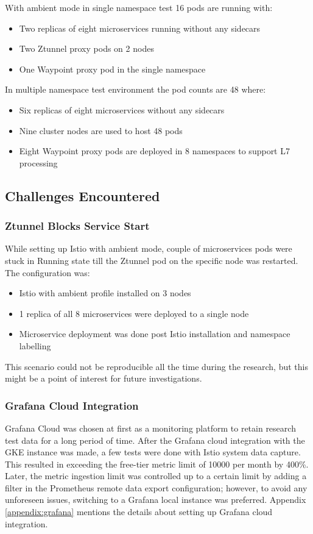 With ambient mode in single namespace test 16 pods are running with:
\begin{itemize}
  \item Two replicas of eight microservices running without any sidecars
  \item Two Ztunnel proxy pods on 2 nodes
  \item One Waypoint proxy pod in the single namespace
\end{itemize}

In multiple namespace test environment the pod counts are 48 where:
\begin{itemize}
  \item Six replicas of eight microservices without any sidecars
  \item Nine cluster nodes are used to host 48 pods
  \item Eight Waypoint proxy pods are deployed in 8 namespaces to support L7 processing
\end{itemize}

\subsection{Challenges Encountered}
\subsubsection{Ztunnel Blocks Service Start}
While setting up Istio with ambient mode, couple of microservices pods were stuck in Running state till the Ztunnel pod on the specific node was restarted. The configuration was:

\begin{itemize}
\item Istio with ambient profile installed on 3 nodes
\item 1 replica of all 8 microservices were deployed to a single node
\item Microservice deployment was done post Istio installation and namespace labelling
\end{itemize}

This scenario could not be reproducible all the time during the research, but this might be a point of interest for future investigations.

\subsubsection{Grafana Cloud Integration}
Grafana Cloud was chosen at first as a monitoring platform to retain research test data for a long period of time. After the Grafana cloud integration with the GKE instance was made, a few tests were done with Istio system data capture. This resulted in exceeding the free-tier metric limit of 10000 per month by 400\%. Later, the metric ingestion limit was controlled up to a certain limit by adding a filter in the Prometheus remote data export configuration; however, to avoid any unforeseen issues, switching to a Grafana local instance was preferred. Appendix \ref{appendix:grafana} mentions the details about setting up Grafana cloud integration.